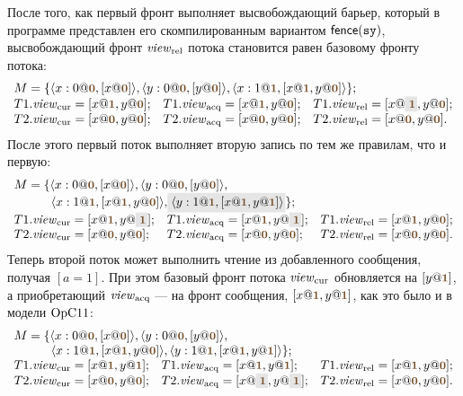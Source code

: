 После того, как первый фронт выполняет высвобождающий барьер, который в программе представлен его скомпилированным
вариантом $\mathsf{fence}({\mathtt{sy}})$, высвобождающий фронт $\mathit{view}_{\mathrm{rel}}$ потока становится равен базовому фронту потока:
\[
\begin{array}{l l l}
\multicolumn{3}{l}{M = \{\angled{x:0@\tstamp{0}, [x@\tstamp{0}]}, \angled{y:0@\tstamp{0}, [y@\tstamp{0}]},
  \angled{x:1@\tstamp{1}, [x@\tstamp{1}, y@\tstamp{0}]} \};} \\
T1.\Rcur = [x@\tstamp{1}, y@\tstamp{0}];           &
T1.\Racq = [x@\tstamp{1}, y@\tstamp{0}];           &
T1.\Rrel = [x@\graybox{\tstamp{1}}, y@\tstamp{0}]; \\
T2.\Rcur = [x@\tstamp{0}, y@\tstamp{0}]; &
T2.\Racq = [x@\tstamp{0}, y@\tstamp{0}]; &
T2.\Rrel = [x@\tstamp{0}, y@\tstamp{0}]. \\
\end{array}
\]
После этого первый поток выполняет вторую запись по тем же правилам, что и первую:
\[
\begin{array}{l l l}
\multicolumn{3}{l}{M = \{\angled{x:0@\tstamp{0}, [x@\tstamp{0}]}, \angled{y:0@\tstamp{0}, [y@\tstamp{0}]},} \\
\multicolumn{3}{l}{
\quad \quad \quad \angled{x:1@\tstamp{1}, [x@\tstamp{1}, y@\tstamp{0}]}, \graybox{\angled{y:1@\tstamp{1}, [x@\tstamp{1}, y@\tstamp{1}]}} \};} \\
T1.\Rcur = [x@\tstamp{1}, y@\graybox{\tstamp{1}}]; &
T1.\Racq = [x@\tstamp{1}, y@\graybox{\tstamp{1}}]; &
T1.\Rrel = [x@\tstamp{1}, y@\tstamp{0}]; \\
T2.\Rcur = [x@\tstamp{0}, y@\tstamp{0}]; &
T2.\Racq = [x@\tstamp{0}, y@\tstamp{0}]; &
T2.\Rrel = [x@\tstamp{0}, y@\tstamp{0}]. \\
\end{array}
\]
Теперь второй поток может выполнить чтение из добавленного сообщения, получая $[a = 1]$.
При этом базовый фронт потока $\mathit{view}_{\mathrm{cur}}$ обновляется на $[y@\tstamp{1}]$, а приобретающий $\mathit{view}_{\mathrm{acq}}$ --- на фронт сообщения,
$[x@\tstamp{1}, y@\tstamp{1}]$, как это было и в модели $\mathrm{OpC11}$:
\[
\begin{array}{l l l}
\multicolumn{3}{l}{M = \{\angled{x:0@\tstamp{0}, [x@\tstamp{0}]}, \angled{y:0@\tstamp{0}, [y@\tstamp{0}]},} \\
\multicolumn{3}{l}{
\quad \quad \quad \angled{x:1@\tstamp{1}, [x@\tstamp{1}, y@\tstamp{0}]}, \angled{y:1@\tstamp{1}, [x@\tstamp{1}, y@\tstamp{1}]} \};} \\
T1.\Rcur = [x@\tstamp{1}, y@\tstamp{1}]; &
T1.\Racq = [x@\tstamp{1}, y@\tstamp{1}]; &
T1.\Rrel = [x@\tstamp{1}, y@\tstamp{0}]; \\
T2.\Rcur = [x@\tstamp{0}, y@\tstamp{0}]; &
T2.\Racq = [x@\graybox{\tstamp{1}}, y@\graybox{\tstamp{1}}]; &
T2.\Rrel = [x@\tstamp{0}, y@\tstamp{0}]. \\
\end{array}
\]
